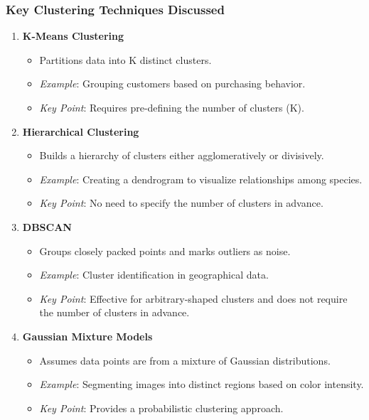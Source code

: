 \documentclass[aspectratio=169]{beamer}
\begin{document}
\begin{frame}[fragile]
    \frametitle{Key Clustering Techniques Discussed}

    \begin{enumerate}
        \item \textbf{K-Means Clustering}
            \begin{itemize}
                \item Partitions data into K distinct clusters.
                \item \textit{Example}: Grouping customers based on purchasing behavior.
                \item \textit{Key Point}: Requires pre-defining the number of clusters (K).
            \end{itemize}
        
        \item \textbf{Hierarchical Clustering}
            \begin{itemize}
                \item Builds a hierarchy of clusters either agglomeratively or divisively.
                \item \textit{Example}: Creating a dendrogram to visualize relationships among species.
                \item \textit{Key Point}: No need to specify the number of clusters in advance.
            \end{itemize}
        
        \item \textbf{DBSCAN}
            \begin{itemize}
                \item Groups closely packed points and marks outliers as noise.
                \item \textit{Example}: Cluster identification in geographical data.
                \item \textit{Key Point}: Effective for arbitrary-shaped clusters and does not require the number of clusters in advance.
            \end{itemize}
        
        \item \textbf{Gaussian Mixture Models}
            \begin{itemize}
                \item Assumes data points are from a mixture of Gaussian distributions.
                \item \textit{Example}: Segmenting images into distinct regions based on color intensity.
                \item \textit{Key Point}: Provides a probabilistic clustering approach.
            \end{itemize}
    \end{enumerate}
\end{frame}
\end{document}
